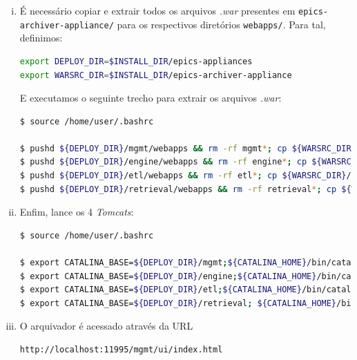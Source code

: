 \begin {enumerate}[i.]
\item É necessário copiar e extrair todos os arquivos \textit{.war} presentes em
\texttt{epics-archiver-appliance/} para os respectivos diretórios
\texttt{webapps/}. Para tal, definimos:

\begin{lstlisting}[language=bash, style=nonumbers]
export DEPLOY_DIR=$INSTALL_DIR/epics-appliances
export WARSRC_DIR=$INSTALL_DIR/epics-archiver-appliance
\end{lstlisting}

E executamos o seguinte trecho para extrair os arquivos \textit{.war}:

\begin{lstlisting}[language=bash, style=nonumbers]
$ source /home/user/.bashrc

$ pushd ${DEPLOY_DIR}/mgmt/webapps && rm -rf mgmt*; cp ${WARSRC_DIR}/mgmt.war .; mkdir mgmt; cd mgmt; jar xf ../mgmt.war; popd; 
$ pushd ${DEPLOY_DIR}/engine/webapps && rm -rf engine*; cp ${WARSRC_DIR}/engine.war .; mkdir engine; cd engine; jar xf ../engine.war; popd; 
$ pushd ${DEPLOY_DIR}/etl/webapps && rm -rf etl*; cp ${WARSRC_DIR}/etl.war .; mkdir etl; cd etl; jar xf ../etl.war; popd; 
$ pushd ${DEPLOY_DIR}/retrieval/webapps && rm -rf retrieval*; cp ${WARSRC_DIR}/retrieval.war .; mkdir retrieval; cd retrieval; jar xf ../retrieval.war; popd;

\end{lstlisting}

\item Enfim, lance os 4 \textit{Tomcats}:

\begin{lstlisting}[language=bash, style=nonumbers]
$ source /home/user/.bashrc

$ export CATALINA_BASE=${DEPLOY_DIR}/mgmt;${CATALINA_HOME}/bin/catalina.sh start 
$ export CATALINA_BASE=${DEPLOY_DIR}/engine;${CATALINA_HOME}/bin/catalina.sh start 
$ export CATALINA_BASE=${DEPLOY_DIR}/etl;${CATALINA_HOME}/bin/catalina.sh start 
$ export CATALINA_BASE=${DEPLOY_DIR}/retrieval; ${CATALINA_HOME}/bin/catalina.sh start

\end{lstlisting}

\item O arquivador é acessado através da URL 

\begin{lstlisting}[language=bash, style=nonumbers]
http://localhost:11995/mgmt/ui/index.html
\end{lstlisting}

\end{enumerate} 

